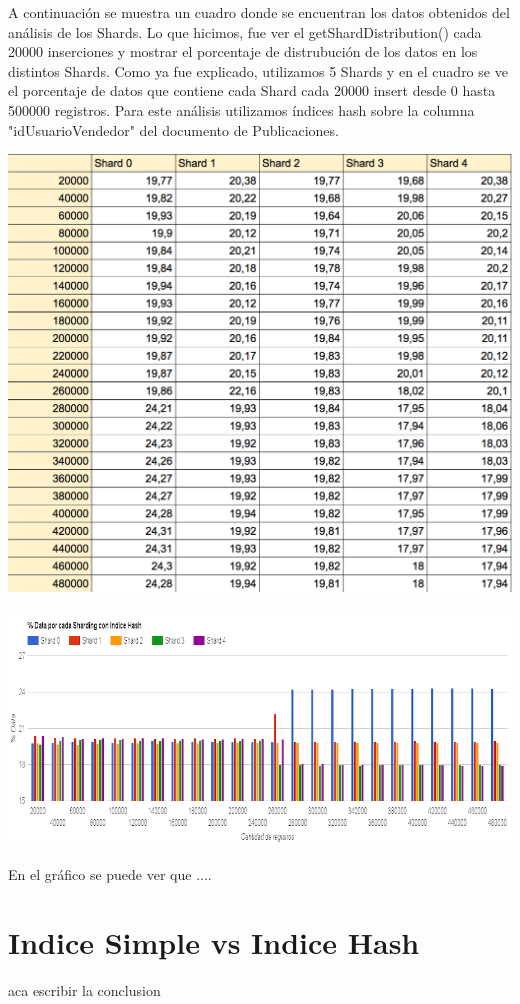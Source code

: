 \documentclass[a4paper, 10pt, twoside]{article}
\begin{document}
A continuaci\'on se muestra un cuadro donde se encuentran los datos obtenidos del an\'alisis de los Shards. Lo que hicimos, fue ver el getShardDistribution() cada 20000 inserciones y mostrar el porcentaje de distrubuci\'on de los datos en los distintos Shards.
Como ya fue explicado, utilizamos 5 Shards y en el cuadro se ve el porcentaje de datos que contiene cada Shard cada 20000 insert desde 0 hasta 500000 registros.
Para este an\'alisis utilizamos \'indices hash sobre la columna "idUsuarioVendedor" del documento de Publicaciones.


\begin{center}
\includegraphics[scale=0.7]{resultado_indice_hash.png}
\end{center}
\includegraphics[scale=0.5]{indice_hash.png}

En el gr\'afico se puede ver que ....

\section{Indice Simple vs Indice Hash}
aca escribir la conclusion 
\end{document}
